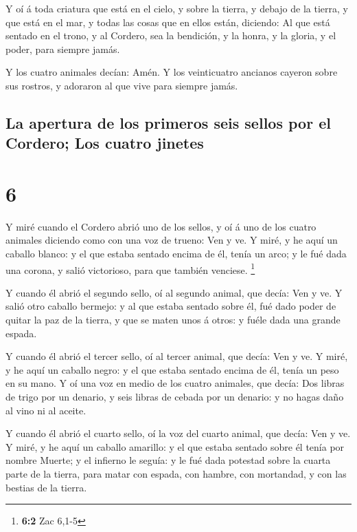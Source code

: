  Y oí á toda criatura que está en el cielo, y sobre la
tierra, y debajo de la tierra, y que está en el mar, y todas las cosas
que en ellos están, diciendo: Al que está sentado en el trono, y al
Cordero, sea la bendición, y la honra, y la gloria, y el poder, para
siempre jamás.

 Y los cuatro animales decían: Amén. Y los veinticuatro
ancianos cayeron sobre sus rostros, y adoraron al que vive para siempre
jamás.

\hypertarget{la-apertura-de-los-primeros-seis-sellos-por-el-cordero-los-cuatro-jinetes}{%
\subsection{La apertura de los primeros seis sellos por el Cordero; Los
cuatro
jinetes}\label{la-apertura-de-los-primeros-seis-sellos-por-el-cordero-los-cuatro-jinetes}}

\hypertarget{section-5}{%
\section{6}\label{section-5}}

 Y miré cuando el Cordero abrió uno de los sellos, y oí á
uno de los cuatro animales diciendo como con una voz de trueno: Ven y
ve.  Y miré, y he aquí un caballo blanco: y el que estaba
sentado encima de él, tenía un arco; y le fué dada una corona, y salió
victorioso, para que también venciese. \footnote{\textbf{6:2} Zac 6,1-5}

 Y cuando él abrió el segundo sello, oí al segundo animal,
que decía: Ven y ve.  Y salió otro caballo bermejo: y al
que estaba sentado sobre él, fué dado poder de quitar la paz de la
tierra, y que se maten unos á otros: y fuéle dada una grande espada.

 Y cuando él abrió el tercer sello, oí al tercer animal,
que decía: Ven y ve. Y miré, y he aquí un caballo negro: y el que estaba
sentado encima de él, tenía un peso en su mano.  Y oí una
voz en medio de los cuatro animales, que decía: Dos libras de trigo por
un denario, y seis libras de cebada por un denario: y no hagas daño al
vino ni al aceite.

 Y cuando él abrió el cuarto sello, oí la voz del cuarto
animal, que decía: Ven y ve.  Y miré, y he aquí un caballo
amarillo: y el que estaba sentado sobre él tenía por nombre Muerte; y el
infierno le seguía: y le fué dada potestad sobre la cuarta parte de la
tierra, para matar con espada, con hambre, con mortandad, y con las
bestias de la tierra.

